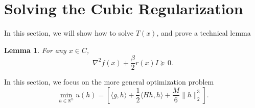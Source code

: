 \documentclass[openany]{book}
\newtheorem{lemma}{Lemma}[chapter]
\theoremstyle{definition}
\theoremstyle{remark}
\begin{document}
\section{Solving the Cubic Regularization}
In this section, we will show how to solve $T(x)$, and prove a technical lemma
\begin{lemma}\label{PSDLemma}
    For any $x\in C$,
    \begin{equation}
        \nabla^2f(x)+\frac{\beta}{2}r(x)I\succeq0.
    \end{equation}
\end{lemma}

In this section, we focus on the more general optimization problem
\begin{equation}
    \min_{h\in \mathbb{R}^n}u(h)=\left[\langle g,h\rangle+\frac{1}{2}\langle Hh,h\rangle+\frac{M}{6}\|h\|_2^3\right].
\end{equation}
\end{document}
